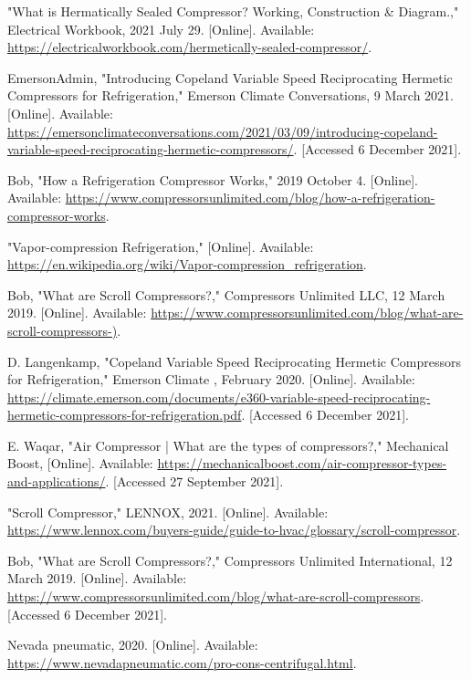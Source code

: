 \documentclass{ucalgarythesis}
\begin{document}
\begin{thebibliography}{9}
     "What is Hermatically Sealed Compressor? Working, Construction \& Diagram.," Electrical Workbook, 2021 July 29. [Online]. Available: \url{https://electricalworkbook.com/hermetically-sealed-compressor/}.

     EmersonAdmin, "Introducing Copeland Variable Speed Reciprocating Hermetic Compressors for Refrigeration," Emerson Climate Conversations, 9 March 2021. [Online]. Available: \url{https://emersonclimateconversations.com/2021/03/09/introducing-copeland-variable-speed-reciprocating-hermetic-compressors/}. [Accessed 6 December 2021].

     Bob, "How a Refrigeration Compressor Works," 2019 October 4. [Online]. Available: \url{https://www.compressorsunlimited.com/blog/how-a-refrigeration-compressor-works}.

     "Vapor-compression Refrigeration," [Online]. Available: \url{https://en.wikipedia.org/wiki/Vapor-compression_refrigeration}.

     Bob, "What are Scroll Compressors?," Compressors Unlimited LLC, 12 March 2019. [Online]. Available: \url{https://www.compressorsunlimited.com/blog/what-are-scroll-compressors-)}.

     D. Langenkamp, "Copeland Variable Speed Reciprocating Hermetic Compressors for Refrigeration," Emerson Climate , February 2020. [Online]. Available: \url{https://climate.emerson.com/documents/e360-variable-speed-reciprocating-hermetic-compressors-for-refrigeration.pdf}. [Accessed 6 December 2021].

     E. Waqar, "Air Compressor | What are the types of compressors?," Mechanical Boost, [Online]. Available: \url{https://mechanicalboost.com/air-compressor-types-and-applications/}. [Accessed 27 September 2021].

     "Scroll Compressor," LENNOX, 2021. [Online]. Available: \url{https://www.lennox.com/buyers-guide/guide-to-hvac/glossary/scroll-compressor}.

     Bob, "What are Scroll Compressors?," Compressors Unlimited International, 12 March 2019. [Online]. Available: \url{https://www.compressorsunlimited.com/blog/what-are-scroll-compressors}. [Accessed 6 December 2021].

     Nevada pneumatic, 2020. [Online]. Available: \url{https://www.nevadapneumatic.com/pro-cons-centrifugal.html}.


\end{thebibliography}
\end{document}
